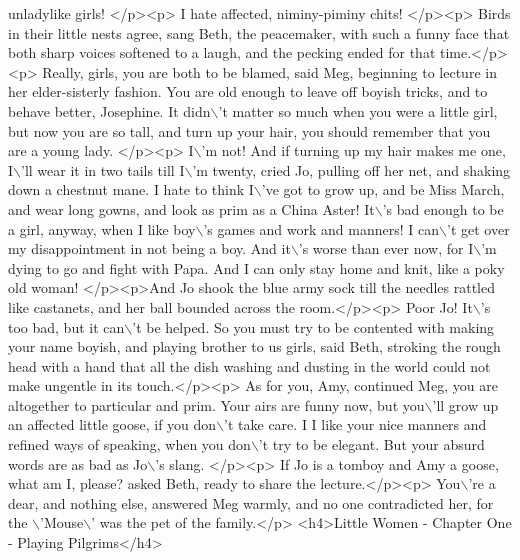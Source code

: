 \begin{DoxyCode}
{       unladylike girls! </p><p> I hate affected, niminy-piminy chits! </p><p> Birds in their little nests agree, 
       sang Beth, the peacemaker, with such a funny face that both sharp voices softened to a laugh, and the 
       pecking  ended for that time.</p><p> Really, girls, you are both to be blamed,  said Meg, beginning to lecture
       in her elder-sisterly fashion. You are old enough to leave off boyish tricks, and to behave better,
       Josephine. It didn\(\backslash\)'t matter so much when you were a little girl, but now you are so tall, and turn up your hair, you
       should remember that you are a young lady. </p><p> I\(\backslash\)'m not!  And if turning up my hair makes me one, I\(\backslash\)'ll
       wear it in two tails till I\(\backslash\)'m twenty,  cried Jo, pulling off her net, and shaking down a chestnut mane.  
       I hate to think I\(\backslash\)'ve got to grow up, and be Miss March, and wear long gowns, and look as prim as a China
       Aster! It\(\backslash\)'s bad enough to be a girl, anyway, when I like boy\(\backslash\)'s games and work and manners! I can\(\backslash\)'t get over
       my disappointment in not being a boy. And it\(\backslash\)'s worse than ever now, for I\(\backslash\)'m dying to go and fight with
       Papa. And I can only stay home and knit, like a poky old woman! </p><p>And Jo shook the blue army sock till
       the needles rattled like castanets, and her ball bounded across the room.</p><p> Poor Jo! It\(\backslash\)'s too bad, but
       it can\(\backslash\)'t be helped. So you must try to be contented with making your name boyish, and playing brother to us
       girls,  said Beth, stroking the rough head with a hand that all the dish washing and dusting in the world
       could not make ungentle in its touch.</p><p> As for you, Amy,  continued Meg,  you are altogether to
       particular and prim. Your airs are funny now, but you\(\backslash\)'ll grow up an affected little goose, if you don\(\backslash\)'t take care.
       I I like your nice manners and refined ways of speaking, when you don\(\backslash\)'t try to be elegant. But your absurd
       words are as bad as Jo\(\backslash\)'s slang. </p><p> If Jo is a tomboy and Amy a goose, what am I, please?  asked Beth,
       ready to share the lecture.</p><p> You\(\backslash\)'re a dear, and nothing else,  answered Meg warmly, and no one
       contradicted her, for the \(\backslash\)'Mouse\(\backslash\)' was the pet of the family.</p>}
\textcolor{stringliteral}{}
\textcolor{stringliteral}{<h4>Little Women - Chapter One - Playing Pilgrims</h4>}

\end{DoxyCode}
